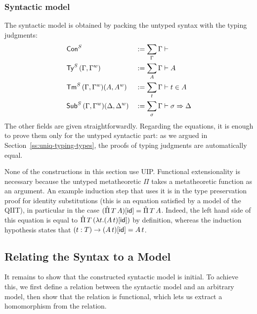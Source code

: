  \subsubsection{Syntactic model}
 The syntactic model is obtained by packing the untyped syntax with the typing
 judgments:
\begin{alignat*}{5}
 & {\mathsf{Con}}^S && := \sum_\Gamma \Gamma\vdash
 \\
 & {\mathsf{Ty}}^S \,(\Gamma,{\Gamma}^w)&& := \sum_A \Gamma\vdash A
 \\
 & {\mathsf{Tm}}^S \,(\Gamma,{\Gamma}^w)(A,{A}^w)&& := \sum_t \Gamma\vdash t \in A
 \\
 & {\mathsf{Sub}}^S \,(\Gamma,{\Gamma}^w)(\Delta,{\Delta}^w)&& := \sum_\sigma \Gamma\vdash \sigma \Rightarrow \Delta
\end{alignat*}
The other fields are given straightforwardly.  Regarding the equations, it is
enough to prove them only for the untyped syntactic part: as we argued in
Section~\ref{ss:uniq-typing-types}, the proofs of typing judgments are
automatically equal.

None of the constructions in this section use UIP. Functional extensionality is
necessary because the untyped metatheoretic $\Pi$ takes a metatheoretic function
as an argument. An example induction step that uses it is in the type
preservation proof for identity substitutions (this is an equation satisfied by
a model of the QIIT), in particular in the case $(\hat{\Pi}\,T\,
A)[\mathsf{id}]=\hat{\Pi}\,T\,A$. Indeed, the left hand side of this equation is equal to
$\hat{\Pi}\,T\,(\lambda t.(A\,t)[\mathsf{id}])$ by definition, whereas the induction
hypothesis states that $(t:T)\rightarrow (A\,t)[\mathsf{id}]=A\,t$.

\subsection{Relating the Syntax to a Model}
It remains to show that the constructed syntactic model is initial. To achieve
this, we first define a relation between the syntactic model and an arbitrary
model, then show that the relation is functional, which lets us extract a
homomorphism from the relation.

